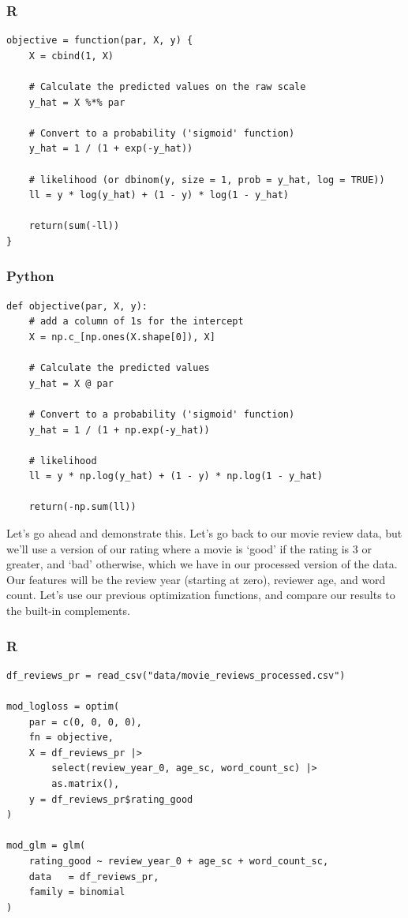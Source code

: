 \documentclass[
  letterpaper,
]{krantz}
\begin{document}
\subsubsection{R}

\begin{verbatim}
objective = function(par, X, y) {
    X = cbind(1, X)

    # Calculate the predicted values on the raw scale
    y_hat = X %*% par

    # Convert to a probability ('sigmoid' function)
    y_hat = 1 / (1 + exp(-y_hat))

    # likelihood (or dbinom(y, size = 1, prob = y_hat, log = TRUE))
    ll = y * log(y_hat) + (1 - y) * log(1 - y_hat)

    return(sum(-ll))
}
\end{verbatim}

\subsubsection{Python}

\begin{verbatim}
def objective(par, X, y):
    # add a column of 1s for the intercept
    X = np.c_[np.ones(X.shape[0]), X]

    # Calculate the predicted values
    y_hat = X @ par
    
    # Convert to a probability ('sigmoid' function)
    y_hat = 1 / (1 + np.exp(-y_hat))
    
    # likelihood
    ll = y * np.log(y_hat) + (1 - y) * np.log(1 - y_hat)
    
    return(-np.sum(ll))
\end{verbatim}

Let's go ahead and demonstrate this. Let's go back to our movie review
data, but we'll use a version of our rating where a movie is `good' if
the rating is 3 or greater, and `bad' otherwise, which we have in our
processed version of the data. Our features will be the review year
(starting at zero), reviewer age, and word count. Let's use our previous
optimization functions, and compare our results to the built-in
complements.

\subsubsection{R}

\begin{verbatim}
df_reviews_pr = read_csv("data/movie_reviews_processed.csv")

mod_logloss = optim(
    par = c(0, 0, 0, 0),
    fn = objective,
    X = df_reviews_pr |>
        select(review_year_0, age_sc, word_count_sc) |>
        as.matrix(),
    y = df_reviews_pr$rating_good
)

mod_glm = glm(
    rating_good ~ review_year_0 + age_sc + word_count_sc,
    data   = df_reviews_pr,
    family = binomial
)
\end{verbatim}
\end{document}
